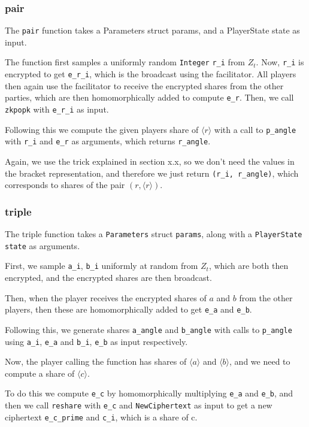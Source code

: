 \documentclass[../main.tex]{subfiles}
\begin{document}
\subsubsection{pair}
The \lstinline{pair} function takes a Parameters struct params, and a PlayerState state as input.

The function first samples a uniformly random \lstinline{Integer} \lstinline{r_i} from $Z_t$. Now, \lstinline{r_i} is encrypted to get \lstinline{e_r_i}, which is the broadcast using the facilitator. All players then again use the facilitator to receive the encrypted shares from the other parties, which are then homomorphically added to compute \lstinline{e_r}. Then, we call \lstinline{zkpopk} with \lstinline{e_r_i} as input.

Following this we compute the given players share of $\langle r \rangle$ with a call to \lstinline{p_angle} with \lstinline{r_i} and \lstinline{e_r} as arguments, which returns \lstinline{r_angle}.

Again, we use the trick explained in section x.x, so we don't need the values in the bracket representation, and therefore we just return \lstinline{(r_i, r_angle)}, which corresponds to shares of the pair $(r, \langle r \rangle)$.

\subsubsection{triple}
The triple function takes a \lstinline{Parameters} struct \lstinline{params}, along with a \lstinline{PlayerState} \lstinline{state} as arguments.

First, we sample \lstinline{a_i}, \lstinline{b_i} uniformly at random from $Z_t$, which are both then encrypted, and the encrypted shares are then broadcast.

Then, when the player receives the encrypted shares of $a$ and $b$ from the other players, then these are homomorphically added to get \lstinline{e_a} and \lstinline{e_b}.

Following this, we generate shares \lstinline{a_angle} and \lstinline{b_angle} with calls to \lstinline{p_angle} using \lstinline{a_i}, \lstinline{e_a} and \lstinline{b_i}, \lstinline{e_b} as input respectively.

Now, the player calling the function has shares of $\langle a \rangle$ and $\langle b \rangle$, and we need to compute a share of $\langle c \rangle$.

To do this we compute \lstinline{e_c} by homomorphically multiplying \lstinline{e_a} and \lstinline{e_b}, and then we call \lstinline{reshare} with \lstinline{e_c} and \lstinline{NewCiphertext} as input to get a new ciphertext \lstinline{e_c_prime} and \lstinline{c_i}, which is a share of c. 
\end{document}
